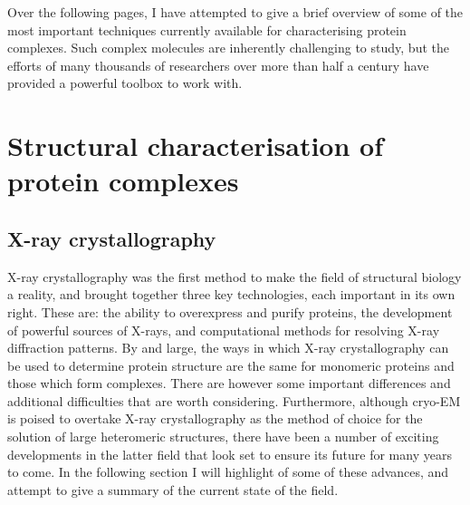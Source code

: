\documentclass[a4paper,11pt,twoside,openright]{scrbook}
\begin{document}
Over the following pages, I have attempted to give a brief overview of some of the most important techniques currently available for characterising protein complexes. Such complex molecules are inherently challenging to study, but the efforts of many thousands of researchers over more than half a century have provided a powerful toolbox to work with.

\section{Structural characterisation of protein complexes}


\subsection{X-ray crystallography}
X-ray crystallography was the first method to make the field of structural biology a reality, and brought together three key technologies, each important in its own right. These are: the ability to overexpress and purify proteins, the development of powerful sources of X-rays, and computational methods for resolving X-ray diffraction patterns. By and large, the ways in which X-ray crystallography can be used to determine protein structure are the same for monomeric proteins and those which form complexes. There are however some important differences and additional difficulties that are worth considering. Furthermore, although cryo-EM is poised to overtake X-ray crystallography as the method of choice for the solution of large heteromeric structures, there have been a number of exciting developments in the latter field that look set to ensure its future for many years to come. In the following section I will highlight of some of these advances, and attempt to give a summary of the current state of the field.
\end{document}

